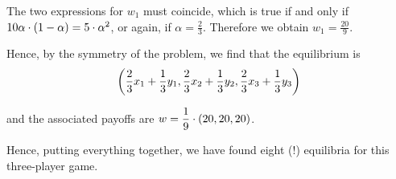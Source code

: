 \begin{enumerate} [label=\Alph*. ]
	      	      
	      The two expressions for $w_1$ must coincide, which is true if and only if $10 \alpha \cdot \left(1 - \alpha\right) = 5 \cdot \alpha^{2}$, or again, if $\alpha = \frac{2}{3}$.
	      Therefore we obtain $w_1 = \frac{20}{9}$.
	      	   
	      Hence, by the symmetry of the problem, we find that the equilibrium is
	      \begin{equation*}
	      	\left(\dfrac{2}{3} x_1 + \dfrac{1}{3} y_1,
	      		\dfrac{2}{3} x_2 + \dfrac{1}{3} y_2,
	      		\dfrac{2}{3} x_3 + \dfrac{1}{3} y_3\right)
	      \end{equation*}
	      	              
	      and the associated payoffs are $w = \dfrac{1}{9} \cdot \left(20, 20, 20\right)$.     
	      	            	              
      	              
\end{enumerate}


Hence, putting everything together, we have found eight (!) equilibria for this three-player game.